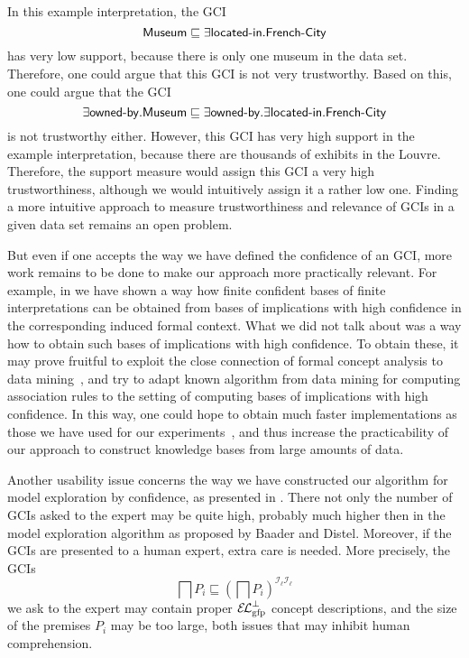 In this example interpretation, the GCI
\begin{equation*}
  \mathsf{Museum} \sqsubseteq \exists \text{\textsf{located-in}}. \text{\textsf{French-City}}
\end{equation*}
has very low support, because there is only one museum in the data set.  Therefore, one
could argue that this GCI is not very trustworthy.  Based on this, one could argue that
the GCI
\begin{equation*}
  \exists \text{\textsf{owned-by}}. \mathsf{Museum} \sqsubseteq \exists
  \text{\textsf{owned-by}}. \exists \text{\textsf{located-in}}. \text{\textsf{French-City}}
\end{equation*}
is not trustworthy either.  However, this GCI has very high support in the example
interpretation, because there are thousands of exhibits in the Louvre.  Therefore, the
support measure would assign this GCI a very high trustworthiness, although we would
intuitively assign it a rather low one.  Finding a more intuitive approach to measure
trustworthiness and relevance of GCIs in a given data set remains an open problem.

But even if one accepts the way we have defined the confidence of an GCI, more work
remains to be done to make our approach more practically relevant.  For example, in
 we have shown a
way how finite confident bases of finite interpretations can be obtained from bases of
implications with high confidence in the corresponding induced formal context.  What we
did not talk about was a way how to obtain such bases of implications with high
confidence.  To obtain these, it may prove fruitful to exploit the close connection of
formal concept analysis to data mining~\cite{arules:Zaki:1998}, and try to adapt known
algorithm from data mining for computing association rules to the setting of computing
bases of implications with high confidence.  In this way, one could hope to obtain much
faster implementations as those we have used for our
experiments~\cite{DBLP:conf/icdm/BorchmannD11}, and thus increase the practicability of
our approach to construct knowledge bases from large amounts of data.

Another usability issue concerns the way we have constructed our algorithm for model
exploration by confidence, as presented in .  There not only
the number of GCIs asked to the expert may be quite high, probably much higher then in the
model exploration algorithm as proposed by Baader and Distel.  Moreover, if the GCIs are
presented to a human expert, extra care is needed.  More precisely, the GCIs
\begin{equation*}
  \bigsqcap P_{i} \sqsubseteq (\bigsqcap P_{i})^{\mathcal{I}_{\ell}\mathcal{I}_{\ell}}
\end{equation*}
we ask to the expert may contain proper $\ELgfpbot$ concept descriptions, and the size of
the premises $P_{i}$ may be too large, both issues that may inhibit human comprehension.

